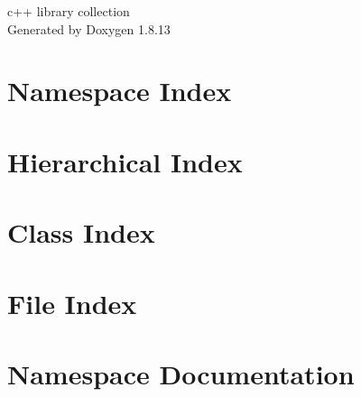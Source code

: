 \documentclass[twoside]{book}
\newcommand{\+}{\discretionary{\mbox{\scriptsize$\hookleftarrow$}}{}{}}
\newcommand{\clearemptydoublepage}{%
  \newpage{\pagestyle{empty}\cleardoublepage}%
}
\begin{document}
\hypersetup{pageanchor=false,
             bookmarksnumbered=true,
             pdfencoding=unicode
            }
\begin{titlepage}
\vspace*{7cm}
\begin{center}%
{\Large c++ library collection }\\
\vspace*{1cm}
{\large Generated by Doxygen 1.8.13}\\
\end{center}
\end{titlepage}
\clearemptydoublepage
{}
\tableofcontents
\clearemptydoublepage
{}
\hypersetup{pageanchor=true}

\chapter{Namespace Index}

\chapter{Hierarchical Index}

\chapter{Class Index}

\chapter{File Index}

\chapter{Namespace Documentation}








\end{document}
